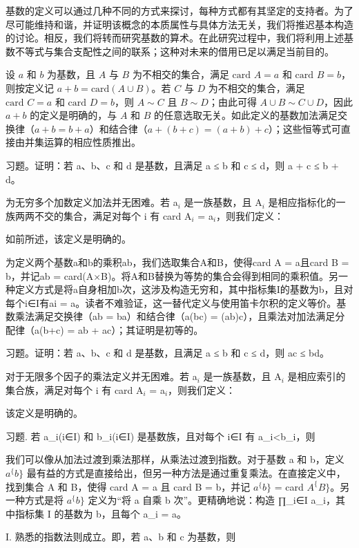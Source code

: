 \documentclass[12pt,a4paper]{ctexbook}
\theoremstyle{definition}
\theoremstyle{remark}
\begin{document}
{基数的定义可以通过几种不同的方式来探讨，每种方式都有其坚定的支持者。为了尽可能维持和谐，并证明该概念的本质属性与具体方法无关，我们将推迟基本构造的讨论。相反，我们将转而研究基数的算术。在此研究过程中，我们将利用上述基数不等式与集合支配性之间的联系；这种对未来的借用已足以满足当前目的。

设 \(a\) 和 \(b\) 为基数，且 \(A\) 与 \(B\) 为不相交的集合，满足 \(\text{card } A = a\) 和 \(\text{card } B = b\)，则按定义记 \(a + b = \text{card}(A \cup B)\)。若 \(C\) 与 \(D\) 为不相交的集合，满足 \(\text{card } C = a\) 和 \(\text{card } D = b\)，则 \(A \sim C\) 且 \(B \sim D\)；由此可得 \(A \cup B \sim C \cup D\)，因此 \(a + b\) 的定义是明确的，与 \(A\) 和 \(B\) 的任意选取无关。如此定义的基数加法满足交换律（\(a + b = b + a\)）和结合律（\(a + (b + c) = (a + b) + c\)）；这些恒等式可直接由并集运算的相应性质推出。

习题。证明：若 a、b、c 和 d 是基数，且满足 a ≤ b 和 c ≤ d，则 a + c ≤ b + d。

为无穷多个加数定义加法并无困难。若 {a$_{i}$} 是一族基数，且 {A$_{i}$} 是相应指标化的一族两两不交的集合，满足对每个 i 有 card A$_{i}$ = a$_{i}$，则我们定义：

如前所述，该定义是明确的。

为定义两个基数a和b的乘积ab，我们选取集合A和B，使得card A = a且card B = b，并记ab = card(A×B)。将A和B替换为等势的集合会得到相同的乘积值。另一种定义方式是将a自身相加b次，这涉及构造无穷和，其中指标集I的基数为b，且对每个i∈I有ai = a。读者不难验证，这一替代定义与使用笛卡尔积的定义等价。基数乘法满足交换律（ab = ba）和结合律（a(bc) = (ab)c），且乘法对加法满足分配律（a(b+c) = ab + ac）；其证明是初等的。

习题。证明：若 a、b、c 和 d 是基数，且满足 a ≤ b 和 c ≤ d，则 ac ≤ bd。

对于无限多个因子的乘法定义并无困难。若 {a$_{i}$} 是一族基数，且 {A$_{i}$} 是相应索引的集合族，满足对每个 i 有 card A$_{i}$ = a$_{i}$，则我们定义：

该定义是明确的。

习题. 若 {a\_i}(i∈I) 和 {b\_i}(i∈I) 是基数族，且对每个 i∈I 有 a\_i<b\_i，则

我们可以像从加法过渡到乘法那样，从乘法过渡到指数。对于基数 a 和 b，定义 $a^\{b\}$ 最有益的方式是直接给出，但另一种方法是通过重复乘法。在直接定义中，找到集合 A 和 B，使得 card A = a 且 card B = b，并记 $a^\{b\}$ = card $A^\{B\}$。另一种方式是将 $a^\{b\}$ 定义为“将 a 自乘 b 次”。更精确地说：构造 ∏\_{i∈I} a\_i，其中指标集 I 的基数为 b，且每个 a\_i = a。

I. 熟悉的指数法则成立。即，若 a、b 和 c 为基数，则

}
\end{document}
